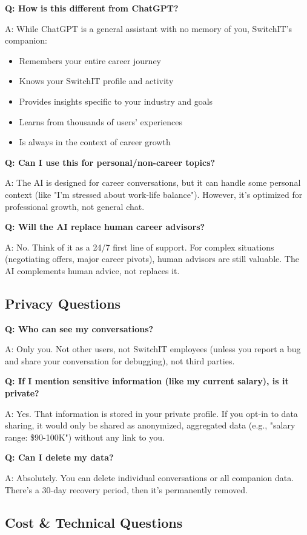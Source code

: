 \documentclass[12pt,a4paper]{article}
\begin{document}
\textbf{Q: How is this different from ChatGPT?}

A: While ChatGPT is a general assistant with no memory of you, SwitchIT's companion:
\begin{itemize}
  \item Remembers your entire career journey
  \item Knows your SwitchIT profile and activity
  \item Provides insights specific to your industry and goals
  \item Learns from thousands of users' experiences
  \item Is always in the context of career growth
\end{itemize}

\textbf{Q: Can I use this for personal/non-career topics?}

A: The AI is designed for career conversations, but it can handle some personal context (like "I'm stressed about work-life balance"). However, it's optimized for professional growth, not general chat.

\textbf{Q: Will the AI replace human career advisors?}

A: No. Think of it as a 24/7 first line of support. For complex situations (negotiating offers, major career pivots), human advisors are still valuable. The AI complements human advice, not replaces it.

\subsection{Privacy Questions}

\textbf{Q: Who can see my conversations?}

A: Only you. Not other users, not SwitchIT employees (unless you report a bug and share your conversation for debugging), not third parties.

\textbf{Q: If I mention sensitive information (like my current salary), is it private?}

A: Yes. That information is stored in your private profile. If you opt-in to data sharing, it would only be shared as anonymized, aggregated data (e.g., "salary range: \$90-100K") without any link to you.

\textbf{Q: Can I delete my data?}

A: Absolutely. You can delete individual conversations or all companion data. There's a 30-day recovery period, then it's permanently removed.

\subsection{Cost \& Technical Questions}
\end{document}
